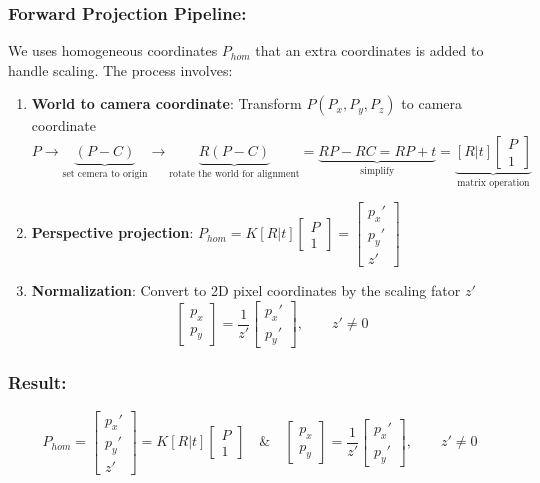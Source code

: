 \documentclass[12pt]{article}
\begin{document}
\subsubsection*{Forward Projection Pipeline:}
We uses homogeneous coordinates $P_{hom}$ that an extra coordinates is added to handle scaling. The process involves:
\begin{enumerate}
    \item \textbf{World to camera coordinate}: Transform $P(P_x,P_y,P_z)$ to camera coordinate
    \[
        P \to \underbrace{(P-C)}_{\text{set cemera to origin}} \to \underbrace{R(P-C)}_{\text{rotate the world for alignment}} = \underbrace{RP-RC = RP+t}_{\text{simplify}} =\underbrace{ [R|t]\begin{bmatrix} P \\ 1 \end{bmatrix}}_{\text{matrix operation}}
    \]
    \item \textbf{Perspective projection}: \(P_{hom} = K[R|t]\begin{bmatrix} P \\ 1 \end{bmatrix} = \begin{bmatrix} p_x' \\ p_y' \\ z' \end{bmatrix}\)
    \item \textbf{Normalization}: Convert to 2D pixel coordinates by the scaling fator $z'$ \\
    \[
    \begin{bmatrix} p_x \\ p_y \end{bmatrix} = \frac{1}{z'}\begin{bmatrix} p_x' \\ p_y' \end{bmatrix}, \qquad z' \neq 0
    \]
\end{enumerate}
\subsubsection*{Result:}
\[
P_{hom} = \begin{bmatrix} p_x' \\ p_y' \\ z' \end{bmatrix} = K[R|t]\begin{bmatrix} P \\ 1 \end{bmatrix} \quad \& \quad \begin{bmatrix} p_x \\ p_y \end{bmatrix} = \frac{1}{z'}\begin{bmatrix} p_x' \\ p_y' \end{bmatrix}, \qquad z' \neq 0
\]
\end{document}
